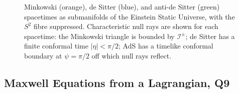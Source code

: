 \begin{figure}[h]
\caption{Minkowski (orange), de Sitter (blue), and anti-de Sitter (green)
spacetimes as submanifolds of the Einstein Static Universe, with the $S^2$
fibre suppressed. Characteristic null rays are shown for each spacetime:
the Minkowski triangle is bounded by $\mathcal{I}^\pm$; de Sitter has a
finite conformal time $|\eta|<\pi/2$; AdS has a timelike conformal boundary
at $\psi=\pi/2$ off which null rays reflect.}
\label{fig:ESU}
\end{figure}
\subsection{Maxwell Equations from a Lagrangian, Q9}

